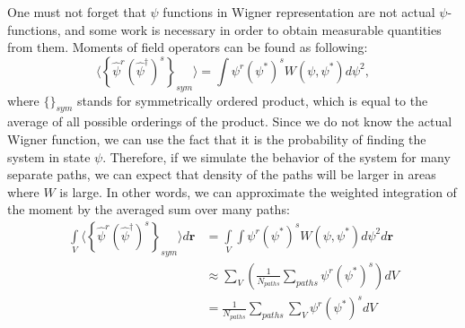 \documentclass[12pt,notitlepage]{report}
\begin{document}
One must not forget that $\psi$ functions in Wigner representation are not actual $\psi$-functions,
and some work is necessary in order to obtain measurable quantities from them.
Moments of field operators can be found as following:
\[
\langle \left\{ \hat{\psi}^r ( \hat{\psi}^\dagger )^s \right\}_{sym} \rangle =
\int \psi^r \left( \psi^* \right)^s W(\psi, \psi^*) d\psi^2,
\]
where $\{\}_{sym}$ stands for symmetrically ordered product,
which is equal to the average of all possible orderings of the product.
Since we do not know the actual Wigner function, we can use the fact that it is the probability of finding the system in state $\psi$.
Therefore, if we simulate the behavior of the system for many separate paths,
we can expect that density of the paths will be larger in areas where $W$ is large.
In other words, we can approximate the weighted integration of the moment by the averaged sum over many paths:
\begin{equation*}
\begin{split}
\int\limits_V \langle \left\{ \hat{\psi}^r ( \hat{\psi}^\dagger )^s \right\}_{sym} \rangle d\mathbf{r} & =
\int\limits_V \int \psi^r \left( \psi^* \right)^s W(\psi, \psi^*) d\psi^2 d\mathbf{r} \\
& \approx \sum\limits_{V} \left( \frac{1}{N_{paths}} \sum\limits_{paths} \psi^r \left( \psi^* \right)^s \right) dV \\
& = \frac{1}{N_{paths}} \sum\limits_{paths} \sum\limits_{V} \psi^r \left( \psi^* \right)^s dV
\end{split}
\end{equation*}
\end{document}
